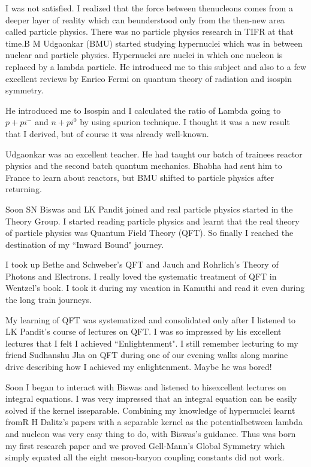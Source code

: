 I was not satisfied. I realized that the force between the\break nucleons 
comes from a deeper layer of reality which can be\break understood only from 
the then-new area called particle physics. There was no particle physics 
research in TIFR at that time.\break B M Udgaonkar (BMU) started studying 
hypernuclei which was in between nuclear and particle physics. 
Hypernuclei are nuclei in which one nucleon is replaced by a lambda 
particle. He introduced me to this subject and also to a few excellent 
reviews by Enrico Fermi on quantum theory of radiation and isospin 
symmetry.
 
He introduced me to Isospin and I calculated the ratio of Lambda going 
to $p + pi^-$ and $n + pi^0$ by using spurion technique. I thought it was a 
new result that I derived, but of course it was already well-known.
 
Udgaonkar was an excellent teacher. He had taught our batch of trainees 
reactor physics and the second batch quantum mecha\-nics. Bhabha had sent 
him to France to learn about reactors, but BMU shifted to particle 
physics after returning.

Soon SN Biswas and LK Pandit joined and real particle physics started in 
the Theory Group. I started reading particle physics and learnt that the 
real theory of particle physics was Quantum Field Theory (QFT). So 
finally I reached the destination of my ``Inward Bound" journey.

I took up Bethe and Schweber's QFT and Jauch and Rohrlich's Theory of 
Photons and Electrons. I really loved the systematic treatment of QFT in 
Wentzel's book. I took it during my vacation in Kamuthi and read it even 
during the long train journeys.

My learning of QFT was systematized and consolidated only after I 
listened to LK Pandit's course of lectures on QFT. I was so impressed by 
his excellent lectures that I felt I achieved ``Enlighten\-ment". I still 
remember lecturing to my friend Sudhanshu Jha on QFT during one of our 
evening walks along marine drive descri\-bing how I achieved my 
enlightenment. Maybe he was bored!
 
Soon I began to interact with Biswas and listened to his\break excellent 
lectures on integral equations. I was very impressed that an integral 
equation can be easily solved if the kernel is\break separable. Combining my 
knowledge of hypernuclei learnt from\break R H Dalitz's papers with a 
separable kernel as the potential\break between lambda and nucleon was very 
easy thing to do, with Biswas's guidance. Thus was born my first 
research paper and we proved Gell-Mann's Global Symmetry which simply 
equated all the eight meson-baryon coupling constants did not work.

